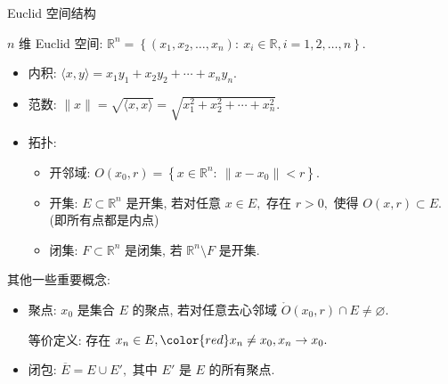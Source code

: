 
\begin{frame}{Euclid 空间结构}

$n$ 维 Euclid 空间: $\mathbb{R}^n = \left\{ (x_1, x_2, \dots, x_n): ~ x_i \in \mathbb{R}, i = 1, 2, \dots, n \right\}.$

\begin{itemize}[<+->]
\item 内积: $\langle x, y \rangle = x_1 y_1 + x_2 y_2 + \cdots + x_n y_n.$
\item 范数: $\lVert x \rVert = \sqrt{\langle x, x \rangle} = \sqrt{x_1^2 + x_2^2 + \cdots + x_n^2}.$
\item 拓扑:
\begin{itemize}[<+->]
\item 开邻域: $O(x_0, r) = \left\{ x \in \mathbb{R}^n: ~ \lVert x - x_0 \rVert < r \right\}.$
\item 开集: $E \subset \mathbb{R}^n$ 是开集, 若对任意 $x \in E,$ 存在 $r > 0,$ 使得 $O(x, r) \subset E.$ (即所有点都是内点)
\item 闭集: $F \subset \mathbb{R}^n$ 是闭集, 若 $\mathbb{R}^n \setminus F$ 是开集.
\end{itemize}
\end{itemize}


其他一些重要概念:
\begin{itemize}[<+->]
\item 聚点: $x_0$ 是集合 $E$ 的聚点, 若对任意去心邻域 $\mathring{O}(x_0, r) \cap E \neq \varnothing.$ \par
等价定义: 存在 $x_n \in E, {\color{red} x_n \neq x_0}, x_n \to x_0.$
\item 闭包: $\overline{E} = E \cup E',$ 其中 $E'$ 是 $E$ 的所有聚点.
\end{itemize}

\end{frame}



